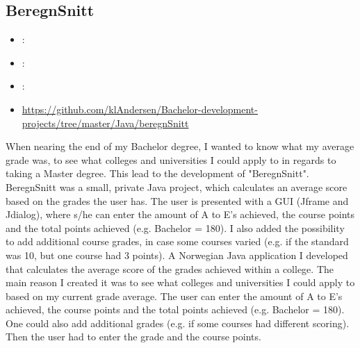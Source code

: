 \subsection{BeregnSnitt}
\label{sec:beregnsnitt}
\begin{itemize} 
	\item {}: 
	\item {}: 
	\item {}: 
	\item {} \url{https://github.com/klAndersen/Bachelor-development-projects/tree/master/Java/beregnSnitt}
\end{itemize} 
When nearing the end of my Bachelor degree, I wanted to know what my average grade was, to see what colleges and universities I could apply to in regards to taking a Master degree. 
This lead to the development of "BeregnSnitt". BeregnSnitt was a small, private Java project, which calculates an average score based on the grades the user has.
\vspace{0.5em}\newline
The user is presented with a GUI (Jframe and Jdialog), where s/he can enter the amount of A to E's achieved, the course points and the total points achieved (e.g. Bachelor = 180). 
I also added the possibility to add additional course grades, in case some courses varied (e.g. if the standard was 10, but one course had 3 points).
\vspace{0.5em}\newline
A Norwegian Java application I developed that calculates the average score of the grades achieved within a college. 
The main reason I created it was to see what colleges and universities I could apply to based on my current grade average. 
The user can enter the amount of A to E's achieved, the course points and the total points achieved (e.g. Bachelor = 180). 
One could also add additional grades (e.g. if some courses had different scoring). 
Then the user had to enter the grade and the course points.

